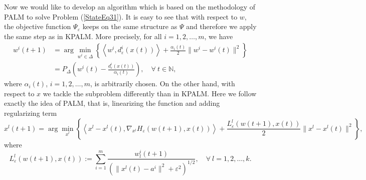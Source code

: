 \documentclass[11pt]{article}
\numberwithin{equation}{section}
\begin{document}
Now we would like to develop an algorithm which is based on the methodology of PALM to solve Problem (\ref{StateEq31}). It is easy to see that with respect to $w$, the objective function $\Psi_{\varepsilon}$ keeps on the same structure as $\Psi$ and therefore we apply the same step as in KPALM. More precisely, for all $i=1,2, \ldots, m$, we have
\begin{align*}
	w^i(t+1) &= \arg\!\min\limits_{w^i \in \Delta} \left\lbrace \left\langle w^i, d^i_{\varepsilon}(x(t)) \right\rangle + \frac{\alpha_i(t)}{2} \|w^i -w^i(t)\|^2 \right\rbrace \\
	&= P_{\Delta} \left( w^i(t) - \frac{d^i_{\varepsilon}(x(t))}{\alpha_i(t)} \right), \quad \forall \: t \in \mathbb{N},
\end{align*}
where $\alpha_i(t)$, $i=1,2, \ldots, m$, is arbitrarily chosen. On the other hand, with respect to $x$ we tackle the subproblem differently than in KPALM. Here we follow exactly the idea of PALM, that is, linearizing the function and adding regularizing term
\begin{equation*}
	x^l(t+1) = \arg\!\min\limits_{x^l} \left\lbrace \left\langle x^l - x^l(t) , \nabla_{x^l}H_{\varepsilon}(w(t+1),x(t)) \right\rangle + \frac{L^l_{\varepsilon}(w(t+1),x(t))}{2} \|x^l - x^l(t)\|^2 \right\rbrace,
\end{equation*}
where 
\begin{equation}
	L^l_{\varepsilon}(w(t+1),x(t)) := \sum\limits_{i=1}^{m} \frac{w^i_l(t+1)}{\left( \|x^l(t)-a^i\|^2 + {\varepsilon}^2 \right)^{1/2}}, \quad \forall \: l=1,2, \ldots, k. \label{L_eps_def}
\end{equation}

\end{document}
